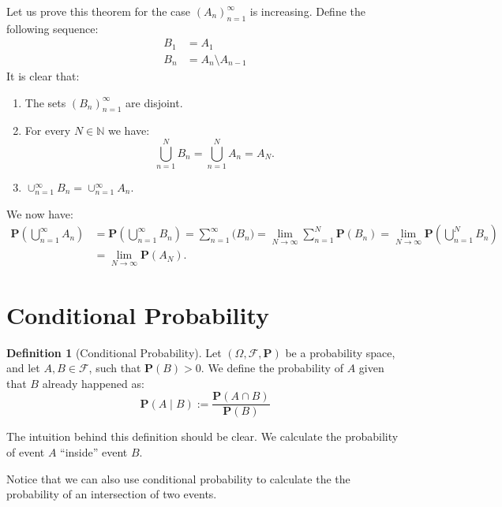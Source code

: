 \documentclass[11pt,a4paper]{article}
\theoremstyle{definition}
\newtheorem{definition}{Definition}[section]
\theoremstyle{plain}
\newcommand{\N}{\mathbb{N}}
\newcommand{\Prob}{\mathbf{P}}
\begin{document}
  Let us prove this theorem for the case $(A_n)_{n=1}^{\infty}$ is increasing.
  Define the following sequence:
  \begin{align*}
    B_1 &= A_1 \\
    B_n &= A_n \setminus A_{n-1}
  \end{align*}
  It is clear that:
  \begin{enumerate}
    \item The sets $(B_n)_{n=1}^{\infty}$ are disjoint.
    \item For every $N \in \N$ we have: 
      \[ \bigcup_{n=1}^{N} B_n = \bigcup_{n=1}^{N} A_n = A_N. \]
    \item $\cup_{n=1}^{\infty} B_n = \cup_{n=1}^{\infty} A_n$.
  \end{enumerate}
  We now have:
  \begin{align*}
    \Prob \left(\bigcup_{n=1}^{\infty} A_n\right) &=
    \Prob \left(\bigcup_{n=1}^{\infty} B_n\right) =
    \sum_{n=1}^{\infty} \mathbf(B_n) =
    \lim_{N \to \infty} \sum_{n=1}^{N} \Prob(B_n) =
    \lim_{N \to \infty} \Prob\left(\bigcup_{n=1}^{N} B_n\right) \\ &=
    \lim_{N \to \infty} \Prob(A_N).
  \end{align*}

  \newpage

  \section{Conditional Probability}
  \begin{definition}[Conditional Probability]
    Let $(\Omega, \mathcal F, \Prob)$ be a probability space, and let
    $A,B \in \mathcal F$, such that $\Prob(B) > 0$. We define the
    probability of $A$ given that $B$ already happened as:
    \[
      \Prob(A \mid B) := \frac{\Prob(A \cap B)}{\Prob(B)}
    \]
  \end{definition}

  The intuition behind this definition should be clear. We calculate the 
  probability of event $A$ ``inside'' event $B$.

  Notice that we can also use conditional probability to calculate the
  the probability of an intersection of two events.
\end{document}
